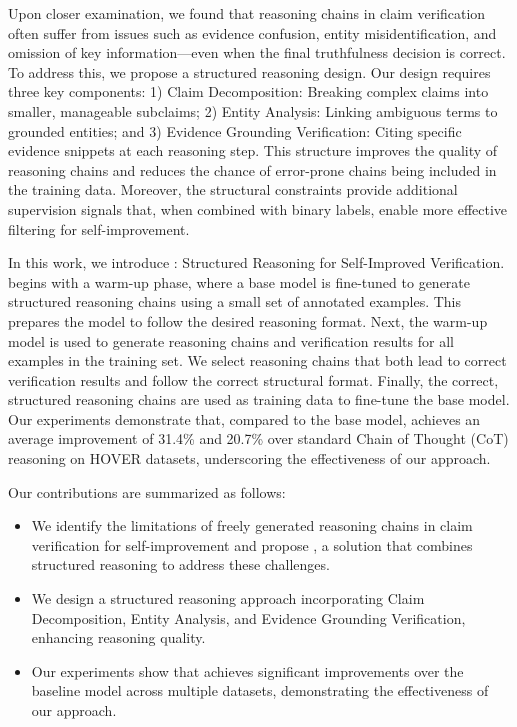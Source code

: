 Upon closer examination, we found that reasoning chains in claim verification often suffer from issues such as evidence confusion, entity misidentification, and omission of key information---even when the final truthfulness decision is correct. To address this, we propose a structured reasoning design. Our design requires three key components: 1) Claim Decomposition: Breaking complex claims into smaller, manageable subclaims; 2) Entity Analysis: Linking ambiguous terms to grounded entities; and 3) Evidence Grounding Verification: Citing specific evidence snippets at each reasoning step. This structure improves the quality of reasoning chains and reduces the chance of error-prone chains being included in the training data. Moreover, the structural constraints provide additional supervision signals that, when combined with binary labels, enable more effective filtering for self-improvement.

In this work, we introduce \themodel: Structured Reasoning for Self-Improved Verification. \themodel begins with a warm-up phase, where a base model is fine-tuned to generate structured reasoning chains using a small set of annotated examples. This prepares the model to follow the desired reasoning format. Next, the warm-up model is used to generate reasoning chains and verification results for all examples in the training set. We select reasoning chains that both lead to correct verification results and follow the correct structural format. Finally, the correct, structured reasoning chains are used as training data to fine-tune the base model. Our experiments demonstrate that, compared to the base model, \themodel achieves an average improvement of 31.4\% and 20.7\% over standard Chain of Thought (CoT) reasoning on HOVER datasets, underscoring the effectiveness of our approach.

Our contributions are summarized as follows:
\begin{itemize}
    \item We identify the limitations of freely generated reasoning chains in claim verification for self-improvement and propose \themodel, a solution that combines structured reasoning to address these challenges.
    \item We design a structured reasoning approach incorporating Claim Decomposition, Entity Analysis, and Evidence Grounding Verification, enhancing reasoning quality.
    \item Our experiments show that \themodel achieves significant improvements over the baseline model across multiple datasets, demonstrating the effectiveness of our approach.
\end{itemize}

